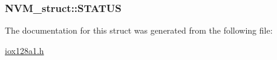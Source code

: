 \label{struct_n_v_m__struct_a1c9ab6940f4dcfbb2c65d3bba6a972f9}
\hypertarget{struct_n_v_m__struct_a61d33f81c1b062383bafbb4a935d3125}{
\subsubsection[{STATUS}]{ {\bf NVM\_\-struct::STATUS}}}
\label{struct_n_v_m__struct_a61d33f81c1b062383bafbb4a935d3125}


The documentation for this struct was generated from the following file:\begin{DoxyCompactItemize}
\item 
\hyperlink{iox128a1_8h}{iox128a1.h}\end{DoxyCompactItemize}
